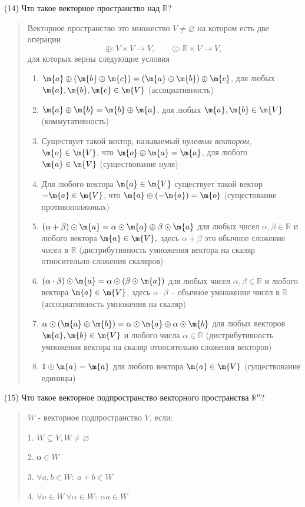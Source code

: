 \documentclass{article}
\begin{document}
(14) Что такое векторное пространство над $\mathbb{R}$?
\begin{quote}
   Векторное пространство это множество $V\ne \varnothing$ на котором есть две операции
\[
 \oplus : V \times V \to V, \qquad \odot : \mathbb{R} \times V \to V,
\]
для которых верны следующие условия

 \begin{enumerate}
        \item $\m{a} \oplus (\m{b} \oplus \m{c}) = (\m{a} \oplus \m{b}) \oplus \m{c}$, для любых $\m{a},\m{b}, \m{c} \in \m{V}$ (ассоциативность)
        \item $\m{a} \oplus \m{b} = \m{b}\oplus \m{a}$, для любых $\m{a}, \m{b} \in \m{V}$ (коммутативность)
        \item Существует такой вектор, называемый \textit{нулевым вектором}, $\m{o} \in \m{V}$, что $\m{o}\oplus \m{a} = \m{a}$, для любого $\m{a} \in \m{V}$ (существование нуля)
        \item Для любого вектора $\m{a} \in \m{V}$ существует такой вектор $-\m{a}\in \m{V}$, что $\m{a} \oplus (-\m{a})  = \m{o}$ (сущестование противополжоных)
        \item $(\alpha+ \beta) \odot \m{a} = \alpha \odot \m{a} \oplus \beta \odot \m{a}$ для любых чисел $\alpha, \beta \in \mathbb{R}$ и любого вектора $\m{a} \in \m{V},$ здесь $\alpha + \beta$ это обычное сложение чисел в $\mathbb{R}$ (дистрибутивность умножения вектора на скаляр относительно сложения скаляров) 
        \item $(\alpha \cdot \beta) \odot \m{a} = \alpha\odot(\beta \odot \m{a})$ для любых чисел $\alpha, \beta \in \mathbb{R}$ и любого вектора $\m{a} \in \m{V}$, здесь $\alpha \cdot \beta$ -- обычное умножение чисел в $\mathbb{R}$ (ассоциативность умножения на скаляр)
        \item $\alpha\odot (\m{a} \oplus \m{b}) = \alpha \odot \m{a} \oplus \alpha \odot \m{b}$ для любых векторов $\m{a},\m{b} \in \m{V}$ и любого числа $\alpha \in \mathbb{R}$ (дистрибутивность умножения вектора на скаляр относительно сложения векторов)
        \item $1 \odot \m{a} = \m{a}$ для любого вектора $\m{a} \in \m{V}$ (существование единицы)
    \end{enumerate}


 
\end{quote}

(15) Что такое векторное подпространство векторного пространства $\mathbb{R}^n$?
\begin{quote}
    $W$ - векторное подпространство $V$, если:
    
    1. $ W \subseteq V, W \ne \varnothing$
    
    2. $\mathbf{o} \in W$

    3. $\forall a, b \in W: \ a + b \in W$
    
    4. $\forall a \in W \ \forall \alpha \in W: \ \alpha a \in W$
\end{quote}
\end{document}
